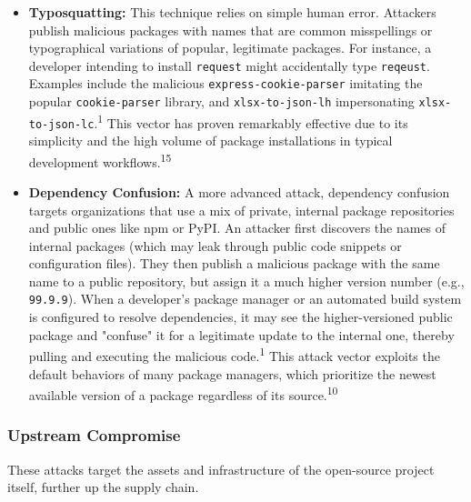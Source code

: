 \documentclass{article}
\begin{document}
\begin{itemize}
\item \textbf{Typosquatting:} This technique relies on simple human error. Attackers publish malicious packages with names that are common misspellings or typographical variations of popular, legitimate packages. For instance, a developer intending to install \lstinline{request} might accidentally type \lstinline{reqeust}. Examples include the malicious \lstinline{express-cookie-parser} imitating the popular \lstinline{cookie-parser} library, and \lstinline{xlsx-to-json-lh} impersonating \lstinline{xlsx-to-json-lc}.\textsuperscript{1} This vector has proven remarkably effective due to its simplicity and the high volume of package installations in typical development workflows.\textsuperscript{15}
\item \textbf{Dependency Confusion:} A more advanced attack, dependency confusion targets organizations that use a mix of private, internal package repositories and public ones like npm or PyPI. An attacker first discovers the names of internal packages (which may leak through public code snippets or configuration files). They then publish a malicious package with the same name to a public repository, but assign it a much higher version number (e.g., \lstinline{99.9.9}). When a developer's package manager or an automated build system is configured to resolve dependencies, it may see the higher-versioned public package and "confuse" it for a legitimate update to the internal one, thereby pulling and executing the malicious code.\textsuperscript{1} This attack vector exploits the default behaviors of many package managers, which prioritize the newest available version of a package regardless of its source.\textsuperscript{10}
\end{itemize}

\subsubsection{Upstream Compromise}

These attacks target the assets and infrastructure of the open-source project itself, further up the supply chain.
\end{document}
